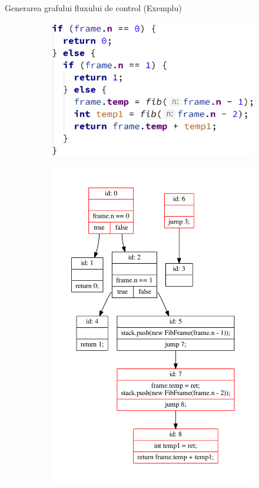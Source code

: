 \documentclass{beamer}
\begin{document}
\begin{frame}{Generarea grafului fluxului de control (Exemplu)}
    \begin{figure}[htb]
        \begin{subfigure}{.42\textwidth}
            \centering
            \includegraphics[width=\textwidth]{img/ref-var-after.png}
        \end{subfigure}
        \hfill
        \begin{subfigure}{.42\textwidth}
            \centering
            \includegraphics[width=\textwidth]{../../../theses/diploma/src/graph/cfg.pdf}

\end{subfigure}
\end{figure}
\end{frame}
\end{document}
